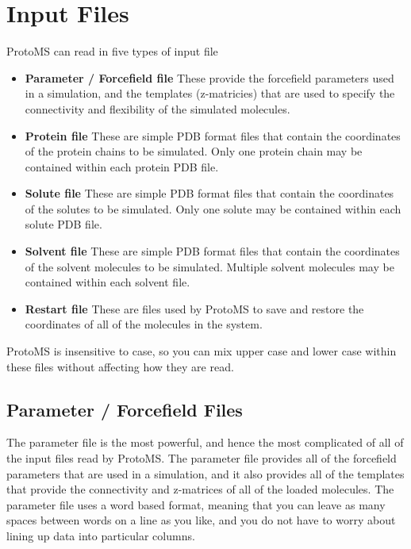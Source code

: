 \documentclass[letterpaper,10pt,english]{sphinxmanual}
\begin{document}
\chapter{Input Files}
\label{protoms:input-files}
ProtoMS can read in five types of input file
\begin{itemize}
\item {} 
\textbf{Parameter / Forcefield file} These provide the forcefield parameters used in a simulation, and the templates (z-matricies) that are used to specify the connectivity and flexibility of the simulated molecules.

\item {} 
\textbf{Protein file} These are simple PDB format files that contain the coordinates of the protein chains to be simulated. Only one protein chain may be contained within each protein PDB file.

\item {} 
\textbf{Solute file} These are simple PDB format files that contain the coordinates of the solutes to be simulated. Only one solute may be contained within each solute PDB file.

\item {} 
\textbf{Solvent file} These are simple PDB format files that contain the coordinates of the solvent molecules to be simulated. Multiple solvent molecules may be contained within each solvent file.

\item {} 
\textbf{Restart file} These are files used by ProtoMS to save and restore the coordinates of all of the molecules in the system.

\end{itemize}

ProtoMS is insensitive to case, so you can mix upper case and lower case within these files without affecting how
they are read.


\section{Parameter / Forcefield Files}
\label{protoms:parfil}\label{protoms:parameter-forcefield-files}
The parameter file is the most powerful, and hence the most complicated of all of the input files read by ProtoMS. The parameter file provides all of the forcefield parameters that are used in a simulation, and it also provides all of the templates that provide the connectivity and z-matrices of all of the loaded molecules. The parameter file uses a word based format, meaning that you can leave as many spaces between words on a line as you like, and you do not have to worry about lining up data into particular columns.
\end{document}
